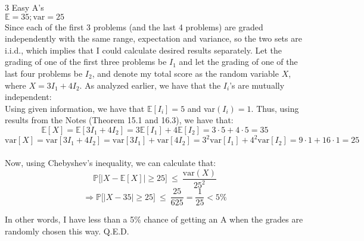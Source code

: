 \documentclass{article}
\begin{document}
{\Large 3 Easy A’s} \\[.5cm]
{\color{red} $\mathbb{E} = 35; \text{var} = 25$ } \\

Since each of the first 3 problems (and the last 4 problems) are graded independently with the same range, expectation and variance, so the two sets are i.i.d., which implies that I could calculate desired results separately. Let the grading of one of the first three problems be $I_1$ and let the grading of one of the last four problems be $I_2$, and denote my total score as the random variable $X$, where $X = 3I_1 + 4I_2$. As analyzed earlier, we have that the $I_i$'s are mutually independent: \\

Using given information, we have that $\mathbb{E}[I_i] = 5$ and var$(I_i) = 1$. Thus, using results from the Notes (Theorem 15.1 and 16.3), we have that:
$$\mathbb{E}[X] = \mathbb{E}[3I_1 + 4I_2] = 3\mathbb{E}[I_1] + 4\mathbb{E}[I_2] = 3\cdot5 + 4\cdot5 = 35$$
$$\text{var}[X] = \text{var}[3I_1 + 4I_2] = \text{var}[3I_1] + \text{var}[4I_2] = 3^2\text{var}[I_1] + 4^2\text{var}[I_2] =
9\cdot1 + 16\cdot1 = 25$$ \\

Now, using Chebyshev's inequality, we can calculate that:
$$\mathbb{P}\big[|X-\mathbb{E}[X]|\geq25\big]\ \leq\ \frac{\text{var}(X)}{25^2}$$
$$\Longrightarrow \mathbb{P}\big[|X-35|\geq25\big]\ \leq\ \frac{25}{625} = \frac{1}{25} < 5\%$$

In other words, I have less than a 5\% chance of getting an A when the grades are randomly chosen this way. Q.E.D.
\end{document}
